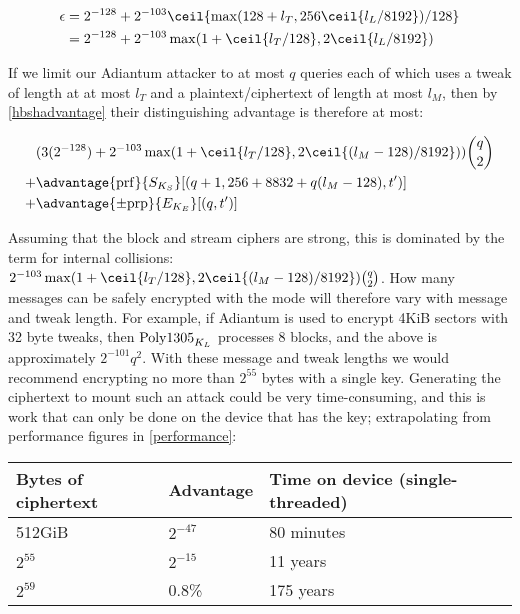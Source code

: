\documentclass[eprint.tex]{subfiles}
\begin{document}
\begin{align*}
\epsilon &= 2^{-128} + 2^{-103}\ceil{\max(128 + l_T, 256\ceil{l_L/8192})/128}  \\
&= 2^{-128} + 2^{-103}\max(1 + \ceil{l_T/128}, 2\ceil{l_L/8192})
\end{align*}\label{adiantumepsilon}

If we limit our Adiantum attacker to at most $q$ queries each of which uses a tweak of length at
at most $l_T$ and a plaintext/ciphertext of length at most $l_M$, then by \autoref{hbshadvantage}
their distinguishing advantage is therefore at most:

\begin{align*}
{}&( 3(2^{-128}) + 2^{-103}\max(1 + \ceil{l_T/128}, 2\ceil{(l_M - 128)/8192}))\binom{q}{2} \\
+{}& \advantage{\mathrm{prf}}{S_{K_S}}[(q + 1, 256 + 8832 + q(l_M - 128), t')] \\
+{}& \advantage{\pm \mathrm{prp}}{E_{K_E}}[(q, t')] \\
\end{align*}

Assuming that the block and stream ciphers are strong, this is dominated by the
term for internal collisions: $2^{-103}\max(1 + \ceil{l_T/128}, 2\ceil{(l_M -
128)/8192})\binom{q}{2}$. How many messages can be safely encrypted with the
mode will therefore vary with message and tweak length. For example, if Adiantum
is used to encrypt 4KiB sectors with 32 byte tweaks, then $\operatorname{Poly1305}_{K_L}$
processes 8 blocks, and the above is approximately $2^{-101}q^2$. With these
message and tweak lengths we would recommend encrypting no more than $2^{55}$
bytes with a single key. Generating the ciphertext to mount such an attack could
be very time-consuming, and this is work that can only be done on the device
that has the key; extrapolating from performance figures in
\autoref{performance}:

\vspace{0.3cm}
\begin{tabular}{llll}
    Bytes of ciphertext & Advantage & Time on device (single-threaded) \\
    \hline
    512GiB & $2^{-47}$ & 80 minutes  \\
    $2^{55}$ & $2^{-15}$ & 11 years \\
    $2^{59}$ & 0.8\% & 175 years &
\end{tabular}
\vspace{0.3cm}

\subbib
\end{document}
